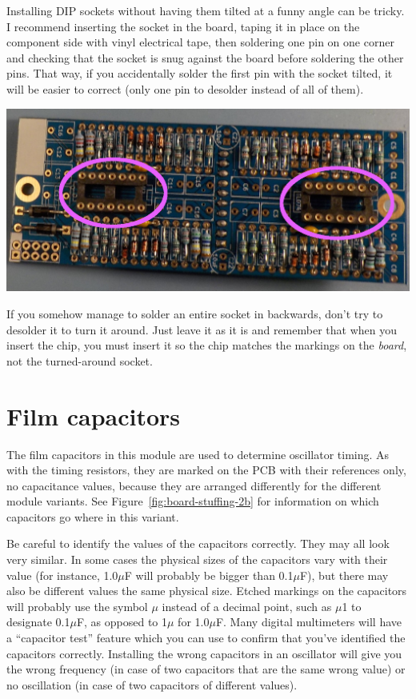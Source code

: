 Installing DIP sockets without having them tilted at a funny angle can be
tricky.  I recommend inserting the socket in the board, taping it in place
on the component side with vinyl electrical tape, then soldering one pin on
one corner and checking that the socket is snug against the board before
soldering the other pins.  That way, if you accidentally solder the first
pin with the socket tilted, it will be easier to correct (only one pin to
desolder instead of all of them).

\noindent\includegraphics[width=\linewidth]{dip-2B.jpg}

If you somehow manage to solder an entire socket in backwards, don't try to
desolder it to turn it around.  Just leave it as it is and remember that
when you insert the chip, you must insert it so the chip matches the
markings on the \emph{board}, not the turned-around socket.

\section{Film capacitors}

The film capacitors in this module are used to determine oscillator timing. 
As with the timing resistors, they are marked on the PCB with their
references only, no capacitance values, because they are arranged
differently for the different module variants.  See
Figure~\ref{fig:board-stuffing-2b} for information on which capacitors go
where in this variant.

Be careful to identify the values of the capacitors correctly.  They may all
look very similar.  In some cases the physical sizes of the capacitors vary
with their value (for instance, 1.0$\mu$F will probably be bigger than
0.1$\mu$F), but there may also be different values the same physical size. 
Etched markings on the capacitors will probably use the symbol $\mu$ instead
of a decimal point, such as $\mu$1 to designate 0.1$\mu$F, as opposed to
1$\mu$ for 1.0$\mu$F.  Many digital multimeters will have a ``capacitor
test'' feature which you can use to confirm that you've identified the
capacitors correctly.  Installing the wrong capacitors in an oscillator
will give you the wrong frequency (in case of two capacitors that are the
same wrong value) or no oscillation (in case of two capacitors of different
values).


